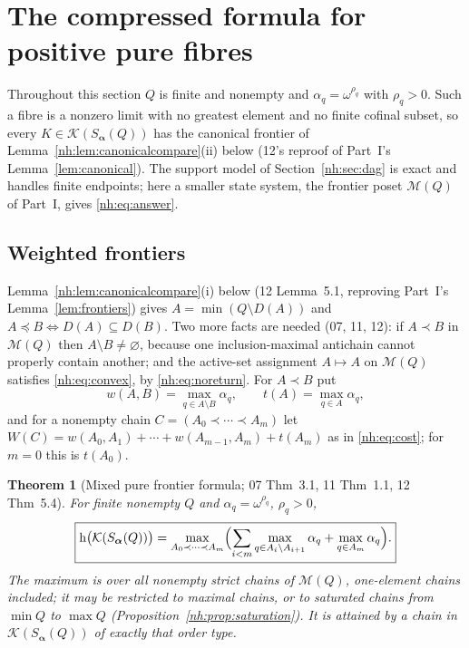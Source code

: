 \documentclass[11pt,a4paper]{article}
\newtheorem{theorem}{Theorem}[section]
\theoremstyle{definition}
\theoremstyle{remark}
\newcommand{\K}{\mathcal K}
\newcommand{\M}{\mathcal M}
\newcommand{\hgt}{\operatorname{h}}
\begin{document}
\section{The compressed formula for positive pure fibres}\label{nh:sec:frontier}

Throughout this section $Q$ is finite and nonempty and
$\alpha_q=\omega^{\rho_q}$ with $\rho_q>0$. Such a fibre is a nonzero limit
with no greatest element and no finite cofinal subset, so every
$K\in\K(S_{\boldsymbol\alpha}(Q))$ has the canonical frontier of
Lemma~\ref{nh:lem:canonicalcompare}(ii) below (12's reproof of Part~I's
Lemma~\ref{lem:canonical}). The support model of
Section~\ref{nh:sec:dag} is exact and handles finite endpoints; here a smaller
state system, the frontier poset $\M(Q)$ of Part~I, gives \eqref{nh:eq:answer}.

\subsection{Weighted frontiers}

Lemma~\ref{nh:lem:canonicalcompare}(i) below (12 Lemma~5.1, reproving
Part~I's Lemma~\ref{lem:frontiers}) gives $A=\min(Q\setminus D(A))$ and
$A\preceq B\iff D(A)\subseteq D(B)$. Two more facts are needed (07, 11, 12):
if $A\prec B$ in $\M(Q)$ then $A\setminus B\ne\varnothing$, because one
inclusion-maximal antichain cannot properly contain another; and the active-set
assignment $A\mapsto A$ on $\M(Q)$ satisfies \eqref{nh:eq:convex}, by
\eqref{nh:eq:noreturn}. For $A\prec B$ put
\begin{equation}\label{nh:eq:frontierweights}
 w(A,B)=\max_{q\in A\setminus B}\alpha_q,\qquad t(A)=\max_{q\in A}\alpha_q,
\end{equation}
and for a nonempty chain $C=(A_0\prec\cdots\prec A_m)$ let
$W(C)=w(A_0,A_1)+\cdots+w(A_{m-1},A_m)+t(A_m)$ as in \eqref{nh:eq:cost}; for
$m=0$ this is $t(A_0)$.

\begin{theorem}[Mixed pure frontier formula; 07 Thm~3.1, 11 Thm~1.1, 12 Thm~5.4]
\label{nh:thm:frontier}
For finite nonempty $Q$ and $\alpha_q=\omega^{\rho_q}$, $\rho_q>0$,
\begin{equation}\label{nh:eq:frontierheight}
 \boxed{\displaystyle
 \hgt\bigl(\K(S_{\boldsymbol\alpha}(Q))\bigr)
 =\max_{A_0\prec\cdots\prec A_m}
 \Bigl(\sum_{i<m}\max_{q\in A_i\setminus A_{i+1}}\alpha_q
       +\max_{q\in A_m}\alpha_q\Bigr).}
\end{equation}
The maximum is over all nonempty strict chains of $\M(Q)$, one-element chains
included; it may be restricted to maximal chains, or to saturated chains from
$\min Q$ to $\max Q$ (Proposition~\ref{nh:prop:saturation}). It is attained by
a chain in $\K(S_{\boldsymbol\alpha}(Q))$ of exactly that order type.
\end{theorem}
\end{document}
